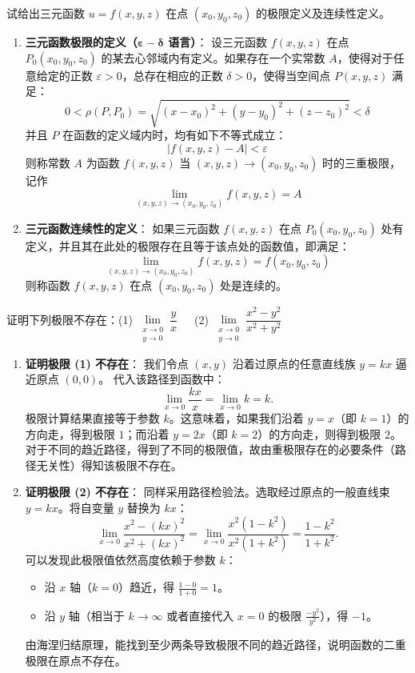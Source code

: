 \documentclass[lang=cn,11pt]{elegantbook}
\begin{document}
\begin{exercise}[三元函数概念推广]
试给出三元函数 $u=f(x,y,z)$ 在点 $(x_0,y_0,z_0)$ 的极限定义及连续性定义。
\end{exercise}
\begin{solution}
\begin{enumerate}
  \item \textbf{三元函数极限的定义（$\boldsymbol{\varepsilon-\delta}$ 语言）}：
  设三元函数 $f(x,y,z)$ 在点 $P_0(x_0,y_0,z_0)$ 的某去心邻域内有定义。如果存在一个实常数 $A$，使得对于任意给定的正数 $\varepsilon > 0$，总存在相应的正数 $\delta > 0$，使得当空间点 $P(x,y,z)$ 满足：
  \[
  0 < \rho(P,P_0) = \sqrt{(x-x_0)^2+(y-y_0)^2+(z-z_0)^2} < \delta
  \]
  并且 $P$ 在函数的定义域内时，均有如下不等式成立：
  \[
  |f(x,y,z) - A| < \varepsilon
  \]
  则称常数 $A$ 为函数 $f(x,y,z)$ 当 $(x,y,z) \to (x_0,y_0,z_0)$ 时的三重极限，记作 \[\displaystyle\lim_{(x,y,z)\to(x_0,y_0,z_0)}f(x,y,z) = A\]  
  \item \textbf{三元函数连续性的定义}：
  如果三元函数 $f(x,y,z)$ 在点 $P_0(x_0,y_0,z_0)$ 处有定义，并且其在此处的极限存在且等于该点处的函数值，即满足：
  \[
  \lim_{(x,y,z)\to(x_0,y_0,z_0)}f(x,y,z) = f(x_0,y_0,z_0)
  \]
  则称函数 $f(x,y,z)$ 在点 $(x_0,y_0,z_0)$ 处是连续的。
\end{enumerate}
\end{solution}

\begin{exercise}[证明极限不存在]
证明下列极限不存在：(1) $\lim\limits_{\substack{x\to 0 \\ y\to 0}} \dfrac{y}{x}$~~~(2) $\lim\limits_{\substack{x\to 0 \\ y\to 0}} \dfrac{x^2-y^2}{x^2+y^2}$
\end{exercise}
\begin{solution}
\begin{enumerate}
  \item[(1)] \textbf{证明极限 (1) 不存在}：
  我们令点 $(x,y)$ 沿着过原点的任意直线族 $y=kx$ 逼近原点 $(0,0)$。
  代入该路径到函数中：
  \[
  \lim_{x\to 0} \frac{kx}{x} = \lim_{x\to 0} k = k.
  \]
  极限计算结果直接等于参数 $k$。这意味着，如果我们沿着 $y=x$（即 $k=1$）的方向走，得到极限 $1$；而沿着 $y=2x$（即 $k=2$）的方向走，则得到极限 $2$。对于不同的趋近路径，得到了不同的极限值，故由重极限存在的必要条件（路径无关性）得知该极限不存在。

  \item[(2)] \textbf{证明极限 (2) 不存在}：
  同样采用路径检验法。选取经过原点的一般直线束 $y=kx$。将自变量 $y$ 替换为 $kx$：
  \[
  \lim_{x\to 0} \frac{x^2-(kx)^2}{x^2+(kx)^2} = \lim_{x\to 0} \frac{x^2(1-k^2)}{x^2(1+k^2)} = \frac{1-k^2}{1+k^2}.
  \]
  可以发现此极限值依然高度依赖于参数 $k$：
  \begin{itemize}
    \item 沿 $x$ 轴（$k=0$）趋近，得 $\frac{1-0}{1+0} = 1$。
    \item 沿 $y$ 轴（相当于 $k\to \infty$ 或者直接代入 $x=0$ 的极限 $\frac{-y^2}{y^2}$），得 $-1$。
  \end{itemize}
  由海涅归结原理，能找到至少两条导致极限不同的趋近路径，说明函数的二重极限在原点不存在。
\end{enumerate}
\end{solution}
\end{document}
